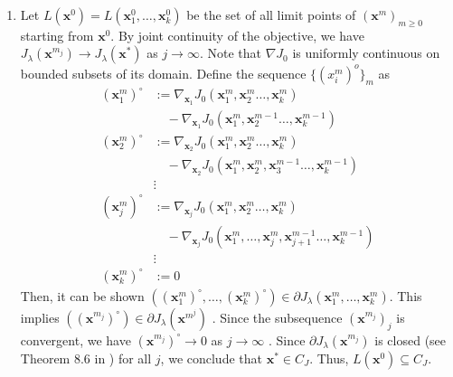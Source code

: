 \begin{IEEEproof}

\begin{enumerate}
	\item Let $L(\mathbf{x}^0)=L(\mathbf{x}_1^0,\dots,\mathbf{x}_k^0)$ be the set of all limit points of $(\mathbf{x}^m)_{m\geq 0}$ starting from $\mathbf{x}^0$. By joint continuity of the objective, we have $J_\lambda(\mathbf{x}^{m_j}) \to J_\lambda(\mathbf{x}^*)$ as $j\to\infty$.
	Note that $\nabla J_0$ is uniformly continuous on bounded subsets of its domain. Define the sequence $\{(x_i^m)^o\}_m$ as
	\begin{align*}
		(\mathbf{x}_1^m)^\circ & := \nabla_{\mathbf{x}_1}J_0(\mathbf{x}_1^m,\mathbf{x}_2^m\dots,\mathbf{x}_k^m) \\
			&\quad - \nabla_{\mathbf{x}_1}J_0(\mathbf{x}_1^m,\mathbf{x}_2^{m-1}\dots,\mathbf{x}_k^{m-1}) \\
		(\mathbf{x}_2^m)^\circ & := \nabla_{\mathbf{x}_2}J_0(\mathbf{x}_1^m,\mathbf{x}_2^m\dots,\mathbf{x}_k^m) \\
			&\quad - \nabla_{\mathbf{x}_2}J_0(\mathbf{x}_1^m,\mathbf{x}_2^m,\mathbf{x}_{3}^{m-1}\dots,\mathbf{x}_k^{m-1}) \\
		&\vdots \\
		(\mathbf{x}_j^m)^\circ & := \nabla_{\mathbf{x}_j}J_0(\mathbf{x}_1^m,\mathbf{x}_2^m\dots,\mathbf{x}_k^m) \\
			&\quad - \nabla_{\mathbf{x}_j}J_0(\mathbf{x}_1^m,\dots,\mathbf{x}_j^m,\mathbf{x}_{j+1}^{m-1}\dots,\mathbf{x}_k^{m-1}) \\
		&\vdots \\
		(\mathbf{x}_k^m)^\circ &:= 0
	\end{align*}
	Then, it can be shown $((\mathbf{x}_1^m)^\circ,\dots,(\mathbf{x}_k^m)^\circ) \in \partial J_\lambda(\mathbf{x}_1^m,\dots,\mathbf{x}_k^m)$. This implies $((\mathbf{x}^{m_j})^{\circ}) \in \partial J_\lambda(\mathbf{x}^{m^j})$ \cite{TsiligkaridisTSP}. Since the subsequence $(\mathbf{x}^{m_j})_j$ is convergent, we have $(\mathbf{x}^{m_j})^\circ \to 0$ as $j \to \infty$ \cite{TsiligkaridisTSP}. Since $\partial J_\lambda(\mathbf{x}^{m_j})$ is closed (see Theorem 8.6 in \cite{VariationalAnalysis}) for all $j$, we conclude that $\mathbf{x}^* \in C_J$. Thus, $L(\mathbf{x}^0) \subseteq C_J$.
	

\end{enumerate}
\end{IEEEproof}
